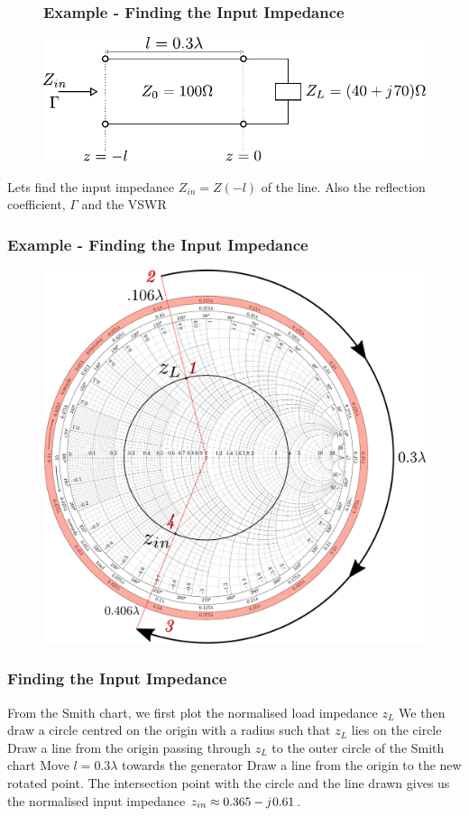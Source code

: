 \documentclass[10pt, compress]{beamer}
\renewcommand{\j}{{j}\mkern1mu} %
\begin{document}
\begin{frame}
    \begin{figure}[t!]
        \frametitle{Example - Finding the Input Impedance}
        \centering
        \includegraphics[width=.9\textwidth]{tline_terminated_example.pdf}
    \end{figure}
    \begin{outline}
        \1 Lets find the input impedance $Z_{in} = Z(-l)$ of the line.
        \1 Also the reflection coefficient, $\Gamma$ and the VSWR
    \end{outline}
\end{frame}

\begin{frame}
    \frametitle{Example - Finding the Input Impedance}
    \begin{figure}[T!]
        \centering
        \includegraphics[width=.70\textwidth]{smith example inkspace.pdf}
    \end{figure}

\end{frame}

\begin{frame}
    \frametitle{Finding the Input Impedance}
    \begin{outline}
        \1 From the Smith chart, we first plot the normalised load impedance $z_L$
        \1 We then draw a circle centred on the origin with a radius such that $z_L$ lies on the circle
        \1 Draw a line from the origin passing through $z_L$ to the outer circle of the Smith chart
        \1 Move $l = 0.3 \lambda$ towards the generator
        \1 Draw a line from the origin to the new rotated point.
        \1 The intersection point with the circle and the line drawn gives us the normalised input impedance $z_{in} \approx 0.365 - \j 0.61 $.
    \end{outline}
\end{frame}
\end{document}
